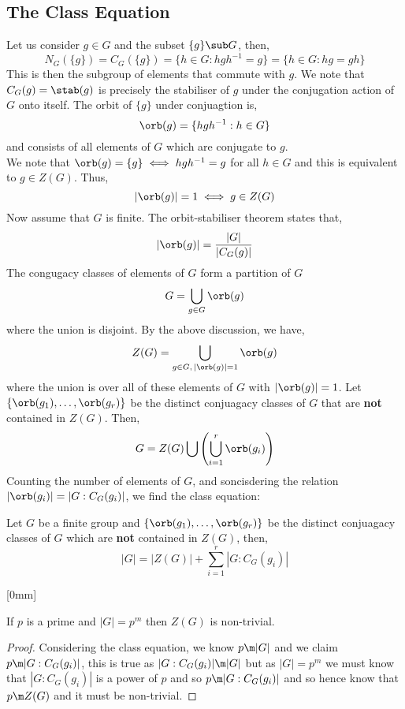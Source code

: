 \subsection{The Class Equation}
Let us consider $g \in G$ and the subset $\{g\} \sub G$, then,
$$ N_G(\{g\})=C_G(\{g\}) = \{h \in G : hgh^{-1} = g\} = \{h \in G : hg = gh\} $$
This is then the subgroup of elements that commute with $g$. We note that $C_G(g) = \stab(g)$ is precisely the stabiliser of $g$ under the conjugation action of $G$ onto itself. The orbit of $\{g\}$ under conjuagtion is,
$$ \orb(g) = \{hgh^{-1} : h \in G\} $$
and consists of all elements of $G$ which are conjugate to $g$. \\
We note that $\orb(g) = \{g\} \iff hgh^{-1} = g$ for all $h \in G$ and this is equivalent to $g \in Z(G)$. Thus,
$$ |\orb(g)| = 1 \iff g \in Z(G) $$
Now assume that $G$ is finite. The orbit-stabiliser theorem states that,
$$ |\orb(g)| = \frac{|G|}{|C_G(g)|} $$
The congugacy classes of elements of $G$ form a partition of $G$
$$ G = \bigcup_{g \in G} \orb(g) $$
where the union is disjoint. By the above discussion, we have,
$$ Z(G) = \bigcup_{g \in G,\,|\orb(g)|=1}\orb(g) $$
where the union is over all of these elements of $G$ with $|\orb(g)|=1$. Let $\{\orb(g_1),\dots, \orb(g_r)\}$ be the distinct conjuagacy classes of $G$ that are \textbf{not} contained in $Z(G)$. Then,
$$ G = Z(G)\bigcup \left(\bigcup_{i=1}^r \orb(g_i)\right)$$
Counting the number of elements of $G$, and soncisdering the relation $|\orb(g_i)| = |G : C_G(g_i)|$, we find the class equation:

\begin{nthm}
  Let $G$ be a finite group and $\{\orb(g_1),\dots, \orb(g_r)\}$ be the distinct conjuagacy classes of $G$ which are \textbf{not} contained in $Z(G)$, then,
  $$ |G| = |Z(G)| + \sum_{i=1}^r |G : C_G(g_i)| $$
\end{nthm}
[0mm]

\begin{nthm}[]
  If $p$ is a prime and $|G| = p^m$ then $Z(G)$ is non-trivial.
\end{nthm}
\begin{proof}
  Considering the class equation, we know $p \m |G|$ and we claim $p \m |G : C_G(g_i)|$, this is true as $|G : C_G(g_i)| \m |G|$ but as $|G| = p^m$ we must know that $|G : C_G(g_i)|$ is a power of $p$ and so $p \m |G : C_G(g_i)|$ and so hence know that $p \m Z(G)$ and it must be non-trivial.
\end{proof}

